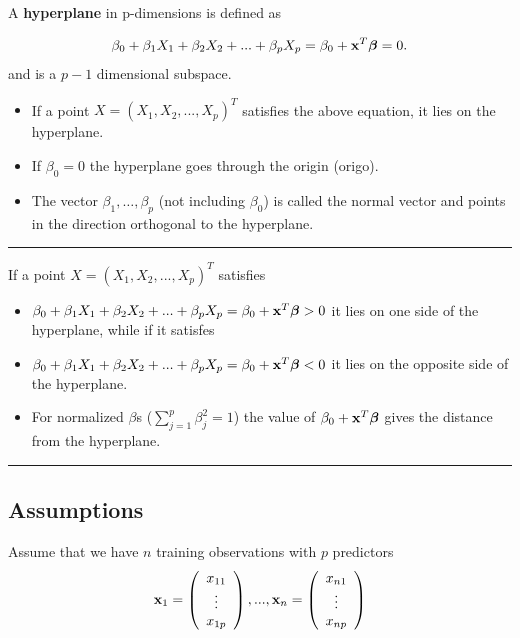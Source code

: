 \documentclass[]{article}
\providecommand{\tightlist}{%
  \setlength{\itemsep}{0pt}\setlength{\parskip}{0pt}}
\begin{document}
A \textbf{hyperplane} in p-dimensions is defined as

\[\beta_0+\beta_1 X_1 + \beta_2 X_2 +...+\beta_p X_p=\beta_0+{\bf x}^T {\boldsymbol \beta}=0.\]
and is a \(p-1\) dimensional subspace.

\begin{itemize}
\tightlist
\item
  If a point \(X=(X_1,X_2,...,X_p)^T\) satisfies the above equation, it
  lies on the hyperplane.
\item
  If \(\beta_0=0\) the hyperplane goes through the origin (origo).
\item
  The vector \(\beta_1, \ldots, \beta_p\) (not including \(\beta_0\)) is
  called the normal vector and points in the direction orthogonal to the
  hyperplane.
\end{itemize}

\begin{center}\rule{0.5\linewidth}{\linethickness}\end{center}

If a point \(X=(X_1,X_2,...,X_p)^T\) satisfies

\begin{itemize}
\tightlist
\item
  \(\beta_0+\beta_1 X_1 + \beta_2 X_2 +...+\beta_p X_p=\beta_0+{\bf x}^T {\boldsymbol \beta}>0\)
  it lies on one side of the hyperplane, while if it satisfes
\item
  \(\beta_0+\beta_1 X_1 + \beta_2 X_2 +...+\beta_p X_p=\beta_0+{\bf x}^T {\boldsymbol \beta}<0\)
  it lies on the opposite side of the hyperplane.
\item
  For normalized \(\beta\)s (\(\sum_{j=1}^p \beta_j^2=1\)) the value of
  \(\beta_0+{\bf x}^T{\boldsymbol \beta}\) gives the distance from the
  hyperplane.
\end{itemize}

\begin{center}\rule{0.5\linewidth}{\linethickness}\end{center}

\hypertarget{assumptions}{%
\subsection{Assumptions}\label{assumptions}}

Assume that we have \(n\) training observations with \(p\) predictors
\[{\bf x}_1=\left(
    \begin{array}{c}
      x_{11} \\
      \vdots \\
      x_{1p}
      \end{array}
  \right) ,..., {\bf x}_n=\left(
    \begin{array}{c}
      x_{n1} \\
      \vdots \\
      x_{np}
      \end{array}
  \right)\]
\end{document}
